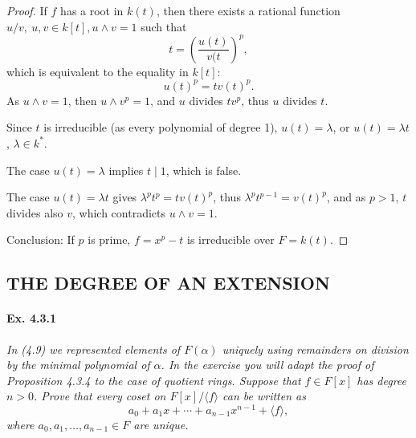 \documentclass[11pt,a4paper]{article}
\begin{document}
\begin{proof}
If $f$ has a root in $k(t)$, then there exists a rational function $u/v,\ u,v \in k[t], u \wedge v = 1$ such that
$$t =\left( \frac{u(t)}{v(t}\right)^p,$$
which is equivalent to the equality in $k[t]$:
$$u(t)^p = t v(t)^p.$$
As $u\wedge v=1$, then $u \wedge v^p=1$, and $u$ divides $t v^p$, thus $u$ divides $t$.

Since $t$ is irreducible (as every polynomial of degree 1), $u(t) = \lambda$, or $u(t) = \lambda t$, $\lambda \in k^*$.

The case $u(t) = \lambda$ implies $t \mid 1$, which is false.

The case $u(t) = \lambda t$ gives $\lambda^p t^p = t v(t)^p$, thus $\lambda^p t^{p-1} = v(t)^p$, and as  $p>1$, $t$ divides also $v$, which contradicts $u \wedge v=1$.

Conclusion: If $p$ is prime, $f =x^p -t$ is irreducible over $F= k(t)$.
\end{proof}

\subsection{THE DEGREE OF AN EXTENSION}
\paragraph{Ex. 4.3.1}

{\it In (4.9) we represented elements of $F(\alpha)$ uniquely using remainders on division by the minimal polynomial of $\alpha$. In the exercise you will adapt the proof of Proposition 4.3.4 to the case of quotient rings. Suppose that $f \in F[x]$ has degree $n>0$. Prove that every coset on $F[x]/\langle f \rangle$ can be written as
$$a_0+a_1x+\cdots+a_{n-1} x^{n-1} + \langle f \rangle,$$
where $a_0,a_1,\ldots,a_{n-1} \in F$ are unique.
}
\end{document}
